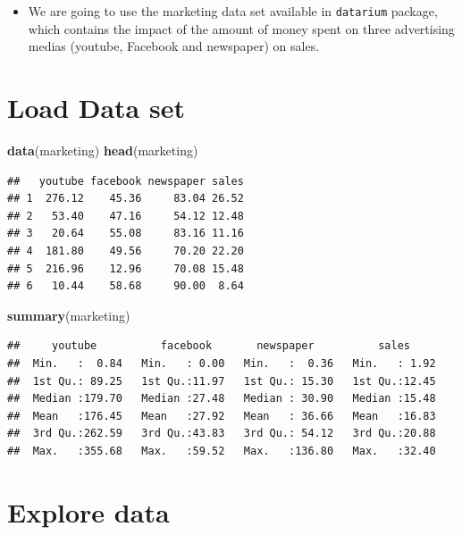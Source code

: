 \documentclass[
]{book}
\newenvironment{Shaded}{\begin{snugshade}}{\end{snugshade}}
\newcommand{\FunctionTok}[1]{\textcolor[rgb]{0.13,0.29,0.53}{\textbf{#1}}}
\newcommand{\NormalTok}[1]{#1}
\providecommand{\tightlist}{%
  \setlength{\itemsep}{0pt}\setlength{\parskip}{0pt}}
\begin{document}
\begin{itemize}
\tightlist
\item
  We are going to use the marketing data set available in \texttt{datarium} package, which contains the impact of the amount of money spent on three advertising medias (youtube, Facebook and newspaper) on sales.
\end{itemize}

\hypertarget{load-data-set}{%
\section{Load Data set}\label{load-data-set}}

\begin{Shaded}
\begin{Highlighting}[]
\FunctionTok{data}\NormalTok{(marketing)}
\FunctionTok{head}\NormalTok{(marketing)}
\end{Highlighting}
\end{Shaded}

\begin{verbatim}
##   youtube facebook newspaper sales
## 1  276.12    45.36     83.04 26.52
## 2   53.40    47.16     54.12 12.48
## 3   20.64    55.08     83.16 11.16
## 4  181.80    49.56     70.20 22.20
## 5  216.96    12.96     70.08 15.48
## 6   10.44    58.68     90.00  8.64
\end{verbatim}

\begin{Shaded}
\begin{Highlighting}[]
\FunctionTok{summary}\NormalTok{(marketing)}
\end{Highlighting}
\end{Shaded}

\begin{verbatim}
##     youtube          facebook       newspaper          sales      
##  Min.   :  0.84   Min.   : 0.00   Min.   :  0.36   Min.   : 1.92  
##  1st Qu.: 89.25   1st Qu.:11.97   1st Qu.: 15.30   1st Qu.:12.45  
##  Median :179.70   Median :27.48   Median : 30.90   Median :15.48  
##  Mean   :176.45   Mean   :27.92   Mean   : 36.66   Mean   :16.83  
##  3rd Qu.:262.59   3rd Qu.:43.83   3rd Qu.: 54.12   3rd Qu.:20.88  
##  Max.   :355.68   Max.   :59.52   Max.   :136.80   Max.   :32.40
\end{verbatim}

\hypertarget{explore-data}{%
\section{Explore data}\label{explore-data}}
\end{document}
